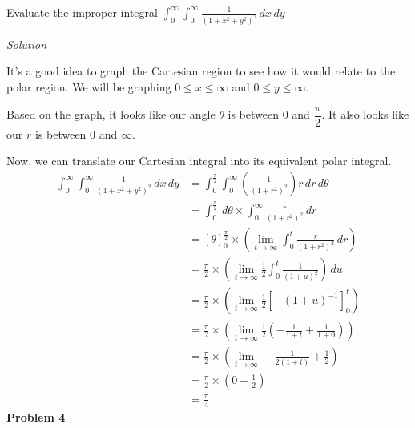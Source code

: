 \documentclass{article}
\newcommand{\lrp}[1]{\left( #1 \right)}
\newcommand{\lrb}[1]{\left[ #1 \right]}
\newcommand{\Solution}{\textit{Solution}}
\begin{document}
Evaluate the improper integral $\displaystyle \int_0^{\infty}\int_0^{\infty}\frac{1}{(1+x^2+y^2)^2}\,dx\,dy$

\Solution

It's a good idea to graph the Cartesian region to see how it would relate to the polar region. We will be graphing $0\leq x \leq \infty$ and $0\leq y \leq \infty$.
\begin{center}
\end{center}
Based on the graph, it looks like our angle $\theta$ is between $0$ and $\dfrac{\pi}{2}$. It also looks like our $r$ is between $0$ and $\infty$.

Now, we can translate our Cartesian integral into its equivalent polar integral.
\begin{align*}
    \int_0^{\infty}\int_0^{\infty}\frac{1}{(1+x^2+y^2)^2}\,dx\,dy&=\int_0^{\frac{\pi}{2}}\int_0^\infty \lrp{\frac{1}{(1+r^2)^2}}r\,dr\,d\theta\tag{in polar, $x^2+y^2=r^2$}\\
    &=\int_0^{\frac{\pi}{2}} \,d\theta \times \int_0^\infty \frac{r}{(1+r^2)^2}\,dr\tag{ok because $r$ is not a function of $\theta$}\\
    &=\lrb{\theta}_0^{\frac{\pi}{2}}\times \lrp{\lim_{t\to\infty}\int_0^t\frac{r}{(1+r^2)^2}\,dr}\\
    &=\frac{\pi}{2}\times\lrp{\lim_{t\to\infty}\frac{1}{2}\int_0^{t}\frac{1}{(1+u)^2}}\,du\\
    &=\frac{\pi}{2}\times\lrp{\lim_{t\to\infty}\frac{1}{2} \lrb{-(1+u)^{-1}}_0^t}\\
    &=\frac{\pi}{2}\times\lrp{\lim_{t\to\infty}\frac{1}{2}\lrp{-\frac{1}{1+t}+\frac{1}{1+0}}}\\
    &=\frac{\pi}{2}\times\lrp{\lim_{t\to\infty}-\frac{1}{2(1+t)}+\frac{1}{2}}\\
    &=\frac{\pi}{2}\times\lrp{0+\frac{1}{2}}\\
    &=\boxed{\frac{\pi}{4}}
\end{align*}
\textbf{Problem 4}
\end{document}
